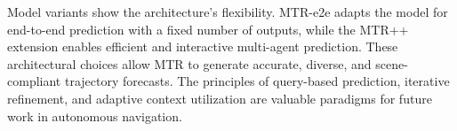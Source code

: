 Model variants show the architecture's flexibility. MTR-e2e adapts the model for end-to-end prediction with a fixed number of outputs, while the MTR++ extension enables efficient and interactive multi-agent prediction. These architectural choices allow MTR to generate accurate, diverse, and scene-compliant trajectory forecasts. The principles of query-based prediction, iterative refinement, and adaptive context utilization are valuable paradigms for future work in autonomous navigation.